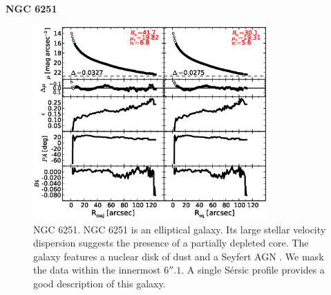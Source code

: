 \documentclass[preprint2]{emulateapj}
\newcommand{\fitfigurewidth}{0.8\textwidth}
\begin{document}
  \clearpage\newpage\noindent
  {\bf NGC 6251 \\}

  \begin{figure}[h]
  \begin{center}
  \includegraphics[width=\fitfigurewidth]{images/n6251_1Dfit.eps}
  \caption{NGC 6251.
  NGC 6251 is an elliptical galaxy. Its large stellar velocity dispersion suggests the presence of a partially depleted core.
  The galaxy features a nuclear disk of dust \citep{ferrareseford1999n6251} and a Seyfert AGN \citep{panessabassani2002}.
  We mask the data within the innermost $6''.1$. 
  A single S\'ersic profile provides a good description of this galaxy.
  }
  \end{center}
  \end{figure}
\end{document}
